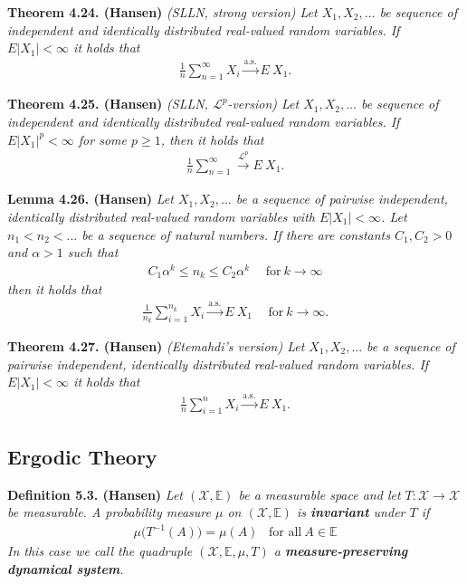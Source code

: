 \documentclass[a4paper,10pt,openany]{book}
\begin{document}
\textbf{Theorem 4.24. (Hansen)} \emph{(SLLN, strong version) Let \(X_1,X_2,...\) be sequence of independent and identically distributed real-valued random variables. If \(E\vert X_1\vert <\infty\) it holds that}
\begin{align*}
    \frac{1}{n}\sum_{n=1}^\infty X_i\stackrel{\text{a.s.}}{\to} E\ X_1.\tag{4.24}
\end{align*}

\textbf{Theorem 4.25. (Hansen)} \emph{(SLLN, \(\mathcal{L}^p\)-version) Let \(X_1,X_2,...\) be sequence of independent and identically distributed real-valued random variables. If \(E\vert X_1\vert^p <\infty\) for some \(p\ge 1\), then it holds that}
\begin{align*}
\frac{1}{n}\sum_{n=1}^\infty \stackrel{\mathcal{L}^p}{\to} E\ X_1.\tag{4.26}    
\end{align*}

\textbf{Lemma 4.26. (Hansen)} \emph{Let \(X_1,X_2,...\) be a sequence of pairwise independent, identically distributed real-valued random variables with \(E\vert X_1\vert <\infty\). Let \(n_1<n_2<...\) be a sequence of natural numbers. If there are constants \(C_1,C_2>0\) and \(\alpha>1\) such that}
\begin{align*}
    C_1\alpha^k\le n_k\le C_2\alpha^k\hspace{15pt}\text{for}\ k\to\infty\tag{4.27}
\end{align*}
\emph{then it holds that}
\begin{align*}
    \frac{1}{n_k}\sum_{i=1}^{n_k}X_i\stackrel{\text{a.s.}}{\to} E\ X_1\hspace{15pt}\text{for}\ k\to \infty.
\end{align*}

\textbf{Theorem 4.27. (Hansen)} \emph{(Etemahdi's version) Let \(X_1,X_2,...\) be a sequence of pairwise independent, identically distributed real-valued random variables. If \(E\vert X_1\vert<\infty\) it holds that}
\begin{align*}
    \frac{1}{n}\sum_{i=1}^nX_i\stackrel{\text{a.s.}}{\to} E\ X_1.\tag{4.30}
\end{align*}

\hypertarget{ergodic-theory}{%
\subsection{Ergodic Theory}\label{ergodic-theory}}

\textbf{Definition 5.3. (Hansen)} \emph{Let \((\mathcal{X},\mathbb{E})\) be a measurable space and let \(T : \mathcal{X}\to \mathcal{X}\) be measurable. A probability measure \(\mu\) on \((\mathcal{X},\mathbb{E})\) is \textbf{invariant} under \(T\) if}
\begin{align*}
    \mu\big(T^{-1}(A)\big)=\mu(A)\hspace{10pt}\text{for all}\ A\in\mathbb{E}\tag{5.5}
\end{align*}
\emph{In this case we call the quadruple \((\mathcal{X},\mathbb{E},\mu,T)\) a \textbf{measure-preserving dynamical system}.}
\end{document}
